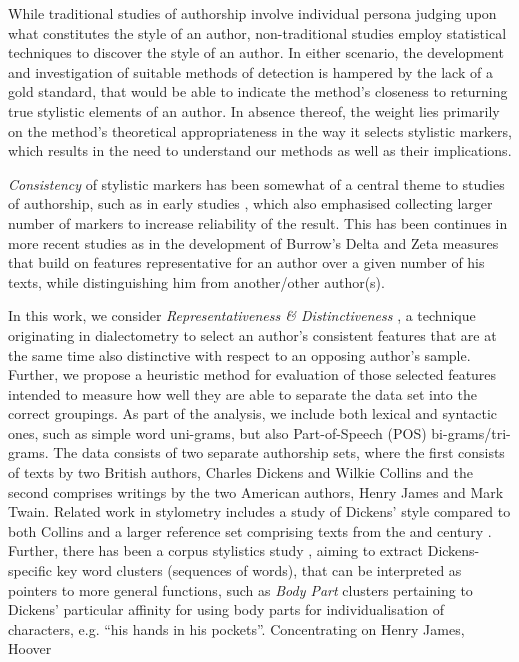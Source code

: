 \documentclass[a4paper,10pt,twoside,fleqn]{article}
\begin{document}
While traditional studies of authorship involve individual persona
judging upon what constitutes the style of an author, non-traditional
studies employ statistical techniques to discover the style of
an author. 
In either scenario, the development and investigation of suitable
methods of detection is hampered by the lack of a gold standard,
that would be able to indicate the method's closeness to 
returning true stylistic elements of an author. 
In absence thereof, the weight lies primarily on the method's 
theoretical appropriateness in the way it selects stylistic 
markers, which results in the need to understand our methods 
as well as their implications. 

\emph{Consistency} of stylistic markers has been somewhat of 
a central theme to studies of authorship, such as in early 
studies \cite{Mosteller2008}, which also emphasised collecting
larger number of markers to increase reliability of the result.
This has been continues in more recent studies as in 
the development of Burrow's Delta \cite{Burrows2002delta} 
and Zeta \cite{Burrows2007all} measures that build on
features representative for an author over a given number
of his texts, while distinguishing him from another/other 
author(s).

In this work, we consider \emph{Representativeness \& Distinctiveness}
\cite{prokic2012detecting}, a technique originating in dialectometry 
to select an author’s consistent features that are at the same time
also distinctive with respect to an opposing author’s sample.
Further, we propose a heuristic method for evaluation of those
selected features intended to measure how well they are able to
separate the data set into the correct groupings. 
As part of the analysis, we include both lexical and syntactic ones, 
such as simple word uni-grams, but also Part-of-Speech (POS) 
bi-grams/tri-grams.
The data consists of two separate authorship sets, where the first
consists of texts by two British authors, Charles Dickens and
Wilkie Collins and the second comprises writings by the two
American authors, Henry James and Mark Twain. 
Related work in stylometry includes a study of Dickens' style
compared to both Collins and a larger reference set comprising
texts from the   and  century \cite{Tabata2012}.
Further, there has been a corpus stylistics study \cite{mahlberg2007clusters},
aiming to extract Dickens-specific key word clusters (sequences of words), 
that can be interpreted as pointers to more general functions, such
as \emph{Body Part} clusters pertaining to Dickens' particular affinity for using 
body parts for individualisation of characters, e.g. ``his hands in his pockets''. 
Concentrating on Henry James, Hoover 
\end{document}
